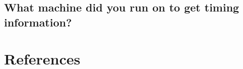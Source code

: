 \documentclass[preprint,12pt]{elsarticle}
\begin{document}
\subsection{What machine did you run on to get timing information?}




\section{References}

%








\end{document}
